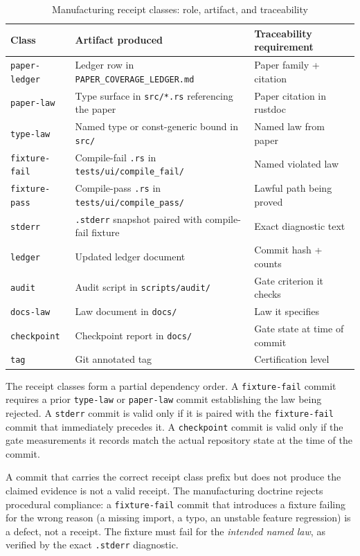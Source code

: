 \begin{table}[ht]
\centering
\caption{Manufacturing receipt classes: role, artifact, and traceability}
\label{tab:receipt-classes}
\begin{tabular}{@{}lll@{}}
\toprule
\textbf{Class} & \textbf{Artifact produced} & \textbf{Traceability requirement} \\
\midrule
\texttt{paper-ledger}  & Ledger row in \texttt{PAPER\_COVERAGE\_LEDGER.md} & Paper family + citation \\
\texttt{paper-law}     & Type surface in \texttt{src/*.rs} referencing the paper & Paper citation in rustdoc \\
\texttt{type-law}      & Named type or const-generic bound in \texttt{src/} & Named law from paper \\
\texttt{fixture-fail}  & Compile-fail \texttt{.rs} in \texttt{tests/ui/compile\_fail/} & Named violated law \\
\texttt{fixture-pass}  & Compile-pass \texttt{.rs} in \texttt{tests/ui/compile\_pass/} & Lawful path being proved \\
\texttt{stderr}        & \texttt{.stderr} snapshot paired with compile-fail fixture & Exact diagnostic text \\
\texttt{ledger}        & Updated ledger document & Commit hash + counts \\
\texttt{audit}         & Audit script in \texttt{scripts/audit/} & Gate criterion it checks \\
\texttt{docs-law}      & Law document in \texttt{docs/} & Law it specifies \\
\texttt{checkpoint}    & Checkpoint report in \texttt{docs/} & Gate state at time of commit \\
\texttt{tag}           & Git annotated tag & Certification level \\
\bottomrule
\end{tabular}
\end{table}

The receipt classes form a partial dependency order. A \texttt{fixture-fail} commit requires
a prior \texttt{type-law} or \texttt{paper-law} commit establishing the law being rejected.
A \texttt{stderr} commit is valid only if it is paired with the \texttt{fixture-fail} commit
that immediately precedes it. A \texttt{checkpoint} commit is valid only if the gate
measurements it records match the actual repository state at the time of the commit.

\begin{remark}
A commit that carries the correct receipt class prefix but does not produce the claimed
evidence is not a valid receipt. The manufacturing doctrine rejects procedural compliance:
a \texttt{fixture-fail} commit that introduces a fixture failing for the wrong reason
(a missing import, a typo, an unstable feature regression) is a defect, not a receipt. The
fixture must fail for the \emph{intended named law}, as verified by the exact
\texttt{.stderr} diagnostic.
\end{remark}


